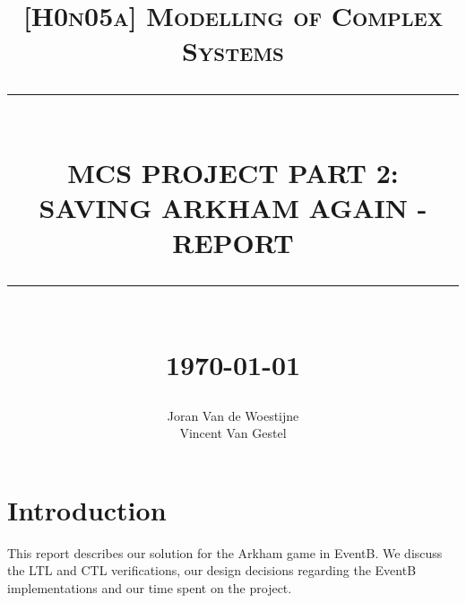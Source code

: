 \documentclass[12pt]{report}
\newcommand{\HRule}[1]{\rule{\linewidth}{#1}}
\begin{document}
\title{ \normalsize \textsc{[H0n05a] Modelling of Complex Systems}
		\\ [2.0cm]
		\HRule{0.5pt} \\
		\LARGE \textbf{\uppercase{MCS Project Part 2: Saving Arkham Again - Report}}
		\HRule{2pt} \\ [0.5cm]
		\normalsize \today \vspace*{5\baselineskip}}

\date{}

\author{
		Joran Van de Woestijne \\
                Vincent Van Gestel}

\maketitle
\newpage

\sectionfont{\scshape}

\section*{Introduction}
This report describes our solution for the Arkham game in EventB. We discuss the LTL and CTL verifications, our design decisions regarding the EventB implementations and our time spent on the project.
\end{document}
